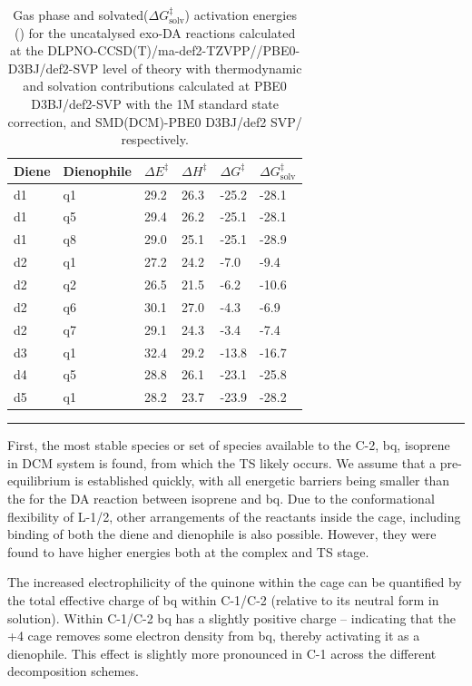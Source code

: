 \documentclass[../../main.tex]{subfiles}
\begin{document}
\begin{table}[h!]
	\def\arraystretch{1.7}
	\begin{tabularx}{\textwidth}{YYYYYY}
		\hline
		Diene	&Dienophile	&$\Delta E^\ddagger$ &$\Delta H^\ddagger$&	$\Delta G^\ddagger$	&$\Delta G^\ddagger_\text{solv}$ \\
		\hline
		d1&	q1	&29.2&	26.3&	-25.2&	-28.1
\\
		d1	&q5	&29.4&	26.2&	-25.1&	-28.1
\\
		d1&	q8	&29.0&	25.1&	-25.1&	-28.9\\
		d2&	q1	&27.2&	24.2&	-7.0&	-9.4
\\
		d2&	q2	&26.5&	21.5&	-6.2&	-10.6
\\
		d2&	q6	&30.1	&27.0&	-4.3&	-6.9
\\
		d2&	q7	&29.1&	24.3&	-3.4&	-7.4
\\
		d3&	q1	&32.4&	29.2&	-13.8&	-16.7
\\
		d4&	q5	&28.8&	26.1&	-23.1&	-25.8
\\
		d5&	q1	&28.2	&23.7&	-23.9&	-28.2\\
	\end{tabularx}
	\hrule
	\vspace{0.2cm}
	\caption{Gas phase and solvated($\Delta G^\ddagger_\text{solv}$) activation energies (\kcal) for the uncatalysed exo-DA reactions calculated at the DLPNO-CCSD(T)/ma-def2-TZVPP//PBE0-D3BJ/def2-SVP level of theory with thermodynamic and solvation contributions calculated at PBE0 D3BJ/def2-SVP with the 1M standard state correction, and SMD(DCM)-PBE0 D3BJ/def2 SVP/ respectively.}
	\label{table::si_da_15}
\end{table}


\clearpage   %


First, the most stable species or set of species available to the C-2, bq, isoprene in DCM system is found, from which the TS likely occurs. We assume that a pre-equilibrium is established quickly, with all energetic barriers being smaller than the for the DA reaction between isoprene and bq. Due to the conformational flexibility of L-1/2, other arrangements of the reactants inside the cage, including binding of both the diene and dienophile is also possible. However, they were found to have higher energies both at the complex and TS stage. 

The increased electrophilicity of the quinone within the cage can be quantified by the total effective charge of bq within C-1/C-2 (relative to its neutral form in solution). Within C-1/C-2 bq has a slightly positive charge – indicating that the +4 cage removes some electron density from bq, thereby activating it as a dienophile. This effect is slightly more pronounced in C-1 across the different decomposition schemes.
\end{document}
